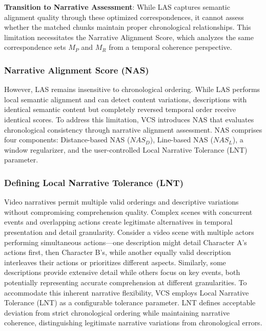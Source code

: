 \documentclass[main.tex]{subfiles}
\begin{document}
\textbf{Transition to Narrative Assessment}: While LAS captures semantic alignment quality through these optimized correspondences, it cannot assess whether the matched chunks maintain proper chronological relationships. This limitation necessitates the Narrative Alignment Score, which analyzes the same correspondence sets $M_P$ and $M_R$ from a temporal coherence perspective.

\subsubsection{Narrative Alignment Score (NAS)}
However, LAS remains insensitive to chronological ordering. While LAS performs local semantic alignment and can detect content variations, descriptions with identical semantic content but completely reversed temporal order receive identical scores. To address this limitation, VCS introduces NAS that evaluates chronological consistency through narrative alignment assessment. NAS comprises four components: Distance-based NAS ($NAS_D$), Line-based NAS ($NAS_L$), a window regularizer, and the user-controlled Local Narrative Tolerance (LNT) parameter.

\subsubsection{Defining Local Narrative Tolerance (LNT)}
Video narratives permit multiple valid orderings and descriptive variations without compromising comprehension quality. Complex scenes with concurrent events and overlapping actions create legitimate alternatives in temporal presentation and detail granularity. Consider a video scene with multiple actors performing simultaneous actions—one description might detail Character A's actions first, then Character B's, while another equally valid description interleaves their actions or prioritizes different aspects. Similarly, some descriptions provide extensive detail while others focus on key events, both potentially representing accurate comprehension at different granularities. To accommodate this inherent narrative flexibility, VCS employs Local Narrative Tolerance (LNT) as a configurable tolerance parameter. LNT defines acceptable deviation from strict chronological ordering while maintaining narrative coherence, distinguishing legitimate narrative variations from chronological errors.
\end{document}
